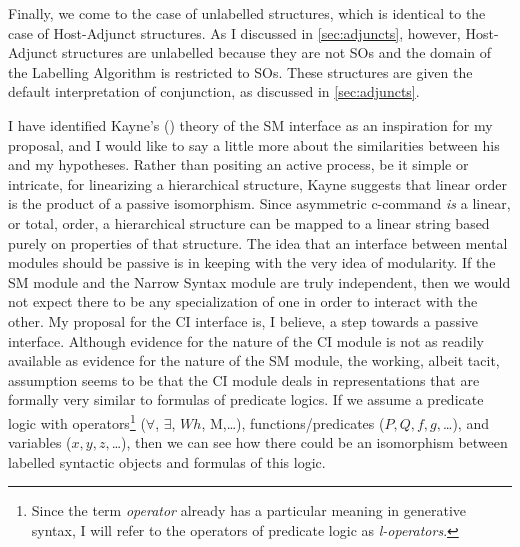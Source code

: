 \documentclass[MilwayThesis]{subfiles}
\begin{document}
Finally, we come to the case of unlabelled structures, which is identical to the case of Host-Adjunct structures.
As I discussed in \cref{sec:adjuncts}, however, Host-Adjunct structures are unlabelled because they are not SOs and the domain of the Labelling Algorithm is restricted to SOs.
These structures are given the default interpretation of conjunction, as discussed in \cref{sec:adjuncts}.

I have identified Kayne's (\citeyear{kayne1994antisymmetry}) theory of the SM interface as an inspiration for my proposal, and I would like to say a little more about the similarities between his and my hypotheses.
Rather than positing an active process, be it simple or intricate, for linearizing a hierarchical structure, Kayne suggests that linear order is the product of a passive isomorphism.
Since asymmetric c-command \textit{is} a linear, or total, order, a hierarchical structure can be mapped to a linear string based purely on properties of that structure.
The idea that an interface between mental modules should be passive is in keeping with the very idea of modularity.
If the SM module and the Narrow Syntax module are truly independent, then we would not expect there to be any specialization of one in order to interact with the other.
My proposal for the CI interface is, I believe, a step towards a passive interface.
Although evidence for the nature of the CI module is not as readily available as evidence for the nature of the SM module, the working, albeit tacit, assumption seems to be that the CI module deals in representations that are formally very similar to formulas of predicate logics.
If we assume a predicate logic with operators\footnote{Since the term \textit{operator} already has a particular meaning in generative syntax, I will refer to the operators of predicate logic as \textit{l-operators}.} ($\forall$, $\exists$, $Wh$, M,\ldots), functions/predicates ($P, Q, f, g,$\ldots), and variables ($x, y, z,$\ldots), then we can see how there could be an isomorphism between labelled syntactic objects and formulas of this logic.
\end{document}
